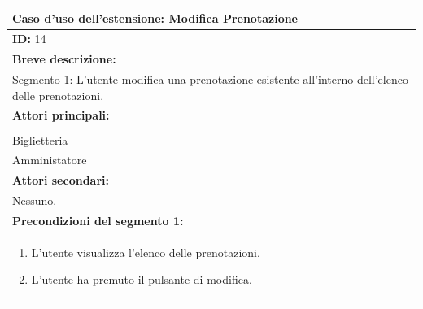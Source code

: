 \documentclass{article}
\begin{document}
                \begin{table}[H]
                    \begin{tabular}{|p{\linewidth}|}
                        \hline
                        \cellcolor{gray!100}
                        \color{white}
                        \centerline{\textbf{Caso d'uso dell'estensione:} Modifica Prenotazione} \\
                        \hline
                        \textbf{ID:} 14 \\
                        \hline
                        \cellcolor{gray!20}
                        \textbf{Breve descrizione:} \\
                        \cellcolor{gray!20}
                        Segmento 1: L'utente modifica una prenotazione esistente all'interno dell'elenco delle prenotazioni. \\
                        \hline
                        \textbf{Attori principali:} \\
                        \begin{minipage}{\linewidth}
                            Cliente \\
                            Biglietteria \\
                            Amministatore
                        \end{minipage}
                        \vspace{0pt} \\
                        \hline
                        \textbf{Attori secondari:} \\                        
                        Nessuno. \\
                        \hline
                        \cellcolor{gray!20}
                        \textbf{Precondizioni del segmento 1:} \\
                        \cellcolor{gray!20}
                        \begin{minipage}{\linewidth}
                            \begin{enumerate}
                                \item L'utente visualizza l'elenco delle prenotazioni.
                                \item L'utente ha premuto il pulsante di modifica.
                            \end{enumerate}
                        \end{minipage}

\end{tabular}
\end{table}
\end{document}
